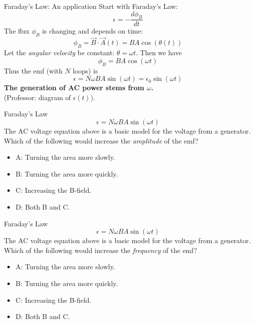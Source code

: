 \documentclass{beamer}
\begin{document}
\begin{frame}{Faraday's Law: An application}
Start with Faraday's Law:
\begin{equation}
\epsilon = - \frac{d\phi_B}{dt}
\end{equation}
The flux $\phi_B$ is changing and depends on time:
\begin{equation}
\phi_B = \vec{B} \cdot \vec{A}(t) = BA\cos(\theta(t))
\end{equation}
Let the \textit{angular velocity} be constant: $\theta = \omega t$.  Then we have
\begin{equation}
\phi_B  = BA\cos(\omega t)
\end{equation}
Thus the emf (with $N$ loops) is
\begin{equation}
\epsilon = N\omega BA \sin(\omega t) = \epsilon_0 \sin(\omega t)
\end{equation}
\textbf{The generation of AC power stems from $\omega$.} \\ (Professor: diagram of $\epsilon(t)$).
\end{frame}

\begin{frame}{Faraday's Law}
\begin{equation}
\epsilon = N\omega BA \sin(\omega t)
\end{equation}
The AC voltage equation above is a basic model for the voltage from a generator.  Which of the following would increase the \textit{amplitude} of the emf?
\begin{itemize}
\item A: Turning the area more slowly.
\item B: Turning the area more quickly.
\item C: Increasing the B-field.
\item D: Both B and C.
\end{itemize}
\end{frame}

\begin{frame}{Faraday's Law}
\begin{equation}
\epsilon = N\omega BA \sin(\omega t)
\end{equation}
The AC voltage equation above is a basic model for the voltage from a generator.  Which of the following would increase the \textit{frequency} of the emf?
\begin{itemize}
\item A: Turning the area more slowly.
\item B: Turning the area more quickly.
\item C: Increasing the B-field.
\item D: Both B and C.
\end{itemize}
\end{frame}
\end{document}
